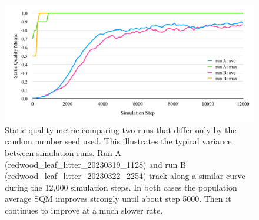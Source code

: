 \documentclass[letterpaper]{article}
\newcommand{\runID}{\footnotesize}
\begin{document}
\begin{figure}[t]
    \includegraphics[width=\columnwidth]{SQM_plot_run_variance.pdf}
    \caption{Static quality metric comparing two runs that differ only by the random number seed used. This illustrates the typical variance between simulation runs. Run A ({\runID redwood\_leaf\_litter\_20230319\_1128}) and run B ({\runID redwood\_leaf\_litter\_20230322\_2254}) track along a similar curve during the 12,000 simulation steps. In both cases the population average SQM improves strongly until about step 5000. Then it continues to improve at a much slower rate.}
    \label{fig:sqm_variance}
\end{figure}

\end{document}
